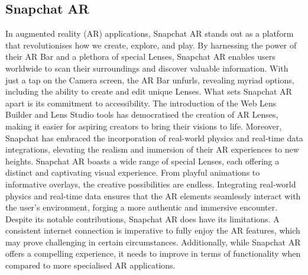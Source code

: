 \subsection{Snapchat AR}
In augmented reality (AR) applications, Snapchat AR stands out as a platform that revolutionises how we create, explore, and play. By harnessing the power of their AR Bar and a plethora of special Lenses, Snapchat AR enables users worldwide to scan their surroundings and discover valuable information. With just a tap on the Camera screen, the AR Bar unfurls, revealing myriad options, including the ability to create and edit unique Lenses.
What sets Snapchat AR apart is its commitment to accessibility. The introduction of the Web Lens Builder and Lens Studio tools has democratised the creation of AR Lenses, making it easier for aspiring creators to bring their visions to life. Moreover, Snapchat has embraced the incorporation of real-world physics and real-time data integrations, elevating the realism and immersion of their AR experiences to new heights.
Snapchat AR boasts a wide range of special Lenses, each offering a distinct and captivating visual experience. From playful animations to informative overlays, the creative possibilities are endless. Integrating real-world physics and real-time data ensures that the AR elements seamlessly interact with the user's environment, forging a more authentic and immersive encounter.
Despite its notable contributions, Snapchat AR does have its limitations. A consistent internet connection is imperative to fully enjoy the AR features, which may prove challenging in certain circumstances. Additionally, while Snapchat AR offers a compelling experience, it needs to improve in terms of functionality when compared to more specialised AR applications.


